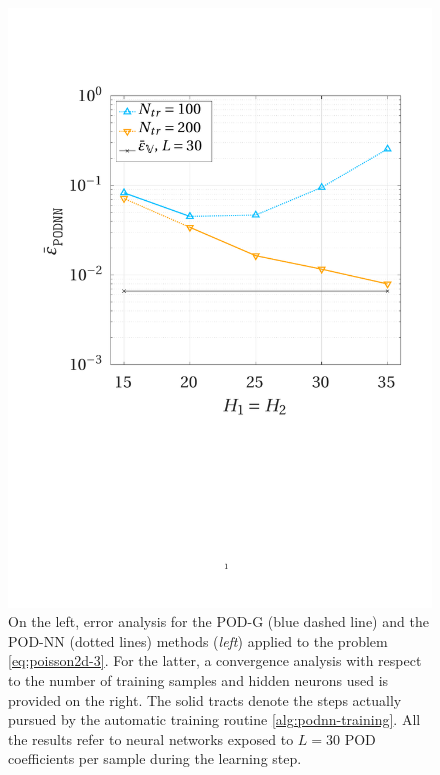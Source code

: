 \documentclass[12pt, a4paper, twoside, openright]{report}
\numberwithin{equation}{chapter}
\theoremstyle{theorem}
\theoremstyle{definition}
\theoremstyle{remark}
\theoremstyle{proposition}
\numberwithin{figure}{chapter}
\begin{document}
\begin{figure}[H]
			\includegraphics[scale = 0.43, trim = {1.5cm 9cm 1.5cm 3.5cm}, clip]{poisson2d_3_nn_convergence}
			
			\caption{On the left, error analysis for the POD-G (blue dashed line) and the POD-NN (dotted lines) methods (\emph{left}) applied to the problem \eqref{eq:poisson2d-3}. For the latter, a convergence analysis with respect to the number of training samples and hidden neurons used is provided on the right. The solid tracts denote the steps actually pursued by the automatic training routine \ref{alg:podnn-training}. All the results refer to neural networks exposed to $L = 30$ POD coefficients per sample during the learning step.}
			\label{}
		\end{figure}
		
\end{document}
